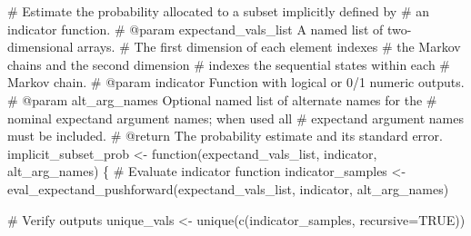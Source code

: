 \documentclass[
  letterpaper,
  DIV=11,
  numbers=noendperiod]{scrartcl}
\newenvironment{Shaded}{\begin{snugshade}}{\end{snugshade}}
\newcommand{\CommentTok}[1]{\textcolor[rgb]{0.37,0.37,0.37}{#1}}
\newcommand{\NormalTok}[1]{\textcolor[rgb]{0.00,0.23,0.31}{#1}}
\newcommand{\OperatorTok}[1]{\textcolor[rgb]{0.37,0.37,0.37}{#1}}
\begin{document}
\begin{Shaded}
\begin{Highlighting}[]
\CommentTok{\# Estimate the probability allocated to a subset implicitly defined by}
\CommentTok{\# an indicator function.}
\CommentTok{\# @param expectand\_vals\_list A named list of two{-}dimensional arrays.}
\CommentTok{\#                            The first dimension of each element indexes}
\CommentTok{\#                            the Markov chains and the second dimension}
\CommentTok{\#                            indexes the sequential states within each}
\CommentTok{\#                            Markov chain.}
\CommentTok{\# @param indicator Function with logical or 0/1 numeric outputs.}
\CommentTok{\# @param alt\_arg\_names Optional named list of alternate names for the}
\CommentTok{\#                      nominal expectand argument names; when used all}
\CommentTok{\#                      expectand argument names must be included.}
\CommentTok{\# @return The probability estimate and its standard error.}
\NormalTok{implicit\_subset\_prob }\OperatorTok{\textless{}{-}}\NormalTok{ function(expectand\_vals\_list,}
\NormalTok{                                 indicator,}
\NormalTok{                                 alt\_arg\_names) \{}
  \CommentTok{\# Evaluate indicator function}
\NormalTok{  indicator\_samples }\OperatorTok{\textless{}{-}}\NormalTok{ eval\_expectand\_pushforward(expectand\_vals\_list,}
\NormalTok{                                                  indicator,}
\NormalTok{                                                  alt\_arg\_names)}

  \CommentTok{\# Verify outputs}
\NormalTok{  unique\_vals }\OperatorTok{\textless{}{-}}\NormalTok{ unique(c(indicator\_samples, recursive}\OperatorTok{=}\NormalTok{TRUE))}


\end{Highlighting}
\end{Shaded}
\end{document}
